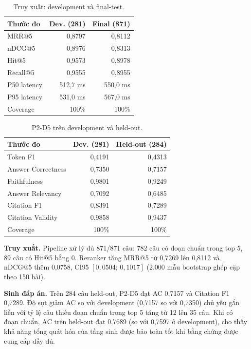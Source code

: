 \par\noindent\begin{minipage}[t]{0.49\linewidth}
\begin{table}[H]
  \centering
  \caption{Truy xuất: development và final-test.}
  \label{tab:phase1-final-test}
  \small
  \begin{tabularx}{\linewidth}{@{}Yrr@{}}
    \toprule
    \textbf{Thước đo} & \textbf{Dev. (281)} &
    \textbf{Final (871)} \\
    \midrule
    MRR@5       & 0,8797 & 0,8112 \\
    nDCG@5      & 0,8976 & 0,8313 \\
    Hit@5       & 0,9573 & 0,8978 \\
    Recall@5    & 0,9555 & 0,8955 \\
    P50 latency & 512,7 ms & 550,0 ms \\
    P95 latency & 531,0 ms & 567,0 ms \\
    Coverage    & 100\% & 100\% \\
    \bottomrule
  \end{tabularx}
\end{table}
\end{minipage}\hfill
\begin{minipage}[t]{0.49\linewidth}
\begin{table}[H]
  \centering
  \caption{P2-D5 trên development và held-out.}
  \label{tab:phase2-zero-shot-heldout}
  \small
  \begin{tabularx}{\linewidth}{@{}Yrr@{}}
    \toprule
    \textbf{Thước đo} & \textbf{Dev. (281)} & \textbf{Held-out (284)} \\
    \midrule
    Token F1 & 0,4191 & 0,4313 \\
    Answer Correctness & 0,7350 & 0,7157 \\
    Faithfulness & 0,9801 & 0,9249 \\
    Answer Relevancy & 0,7092 & 0,6485 \\
    Citation F1 & 0,8391 & 0,7289 \\
    Citation Validity & 0,9858 & 0,9437 \\
    Coverage & 100\% & 100\% \\
    \bottomrule
  \end{tabularx}
\end{table}
\end{minipage}
\par


\noindent\textbf{Truy xuất.} Pipeline xử lý đủ 871/871 câu: 782 câu có đoạn chuẩn trong top 5, 89 câu có Hit@5 bằng 0. Reranker tăng MRR@5 từ 0,7269 lên 0,8112 và nDCG@5 thêm 0,0758, CI95 $[0{,}0504;\,0{,}1017]$ (2.000 mẫu bootstrap ghép cặp theo 150 bài).

\noindent\textbf{Sinh đáp án.} Trên 284 câu held-out, P2-D5 đạt AC 0,7157 và Citation F1 0,7289. Độ sụt giảm AC so với development (0,7157 so với 0,7350) chủ yếu gắn liền với tỷ lệ câu thiếu đoạn chuẩn trong top 5 tăng từ 12 lên 35 câu. Khi có đoạn chuẩn, AC trên held-out đạt 0,7689 (so với 0,7597 ở development), cho thấy khả năng tổng quát hóa của tầng sinh được bảo toàn tốt khi bằng chứng được cung cấp đầy đủ.
